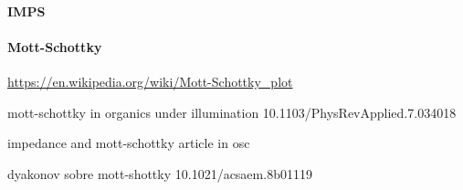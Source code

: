 		\paragraph{IMPS}

		\paragraph{Mott-Schottky}
		\url{https://en.wikipedia.org/wiki/Mott-Schottky_plot}
		
		mott-schottky in organics under illumination 10.1103/PhysRevApplied.7.034018
		
		impedance and mott-schottky article in osc \cite{Brus2016}
		
		dyakonov sobre mott-shottky 10.1021/acsaem.8b01119